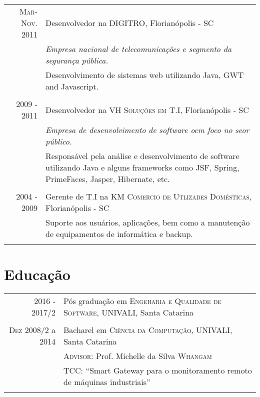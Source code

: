 \documentclass[a4paper,10pt]{article}
\begin{document}
\begin{tabular}{r|p{11cm}}
\textsc{Mar-Nov. 2011} & Desenvolvedor na \textsc{DIGITRO}, Florianópolis - SC \\ &\emph{Empresa nacional de telecomunicações e segmento da segurança pública.}\\&\footnotesize{Desenvolvimento de sistemas web utilizando Java, GWT and Javascript.} \\\multicolumn{2}{c}{} \\

\textsc{2009 - 2011} & Desenvolvedor na \textsc{VH Soluções em T.I}, Florianópolis - SC \\ &\emph{Empresa de desenvolvimento de software ocm foco no seor público.}\\&\footnotesize{Responsável pela análise e desenvolvimento de software utilizando Java e alguns frameworks como JSF, Spring, PrimeFaces, Jasper, Hibernate, etc.}\\\multicolumn{2}{c}{} \\

\textsc{2004 - 2009} & Gerente de T.I na \textsc{KM Comercio de Utlizades Domésticas}, Florianópolis - SC \\&\footnotesize{Suporte aos usuários, aplicações, bem como a manutenção de equipamentos de informática e backup.}\\\multicolumn{2}{c}{} \\ 

\end{tabular}

\section{Educação}

\begin{tabular}{r|p{11cm}}
\textsc{2016 - 2017/2} & Pós graduação em \textsc{Engeharia e Qualidade de Software}, UNIVALI, Santa Catarina\\\multicolumn{2}{c}{} \\
	
\textsc{Dez} 2008/2 a 2014 & Bacharel em \textsc{Ciência da Computação}, UNIVALI, Santa Catarina\\
&\normalsize \textsc{Advisor}: Prof. Michelle da Silva \textsc{Whangam}\\
& TCC: ``Smart Gateway para o monitoramento remoto de máquinas industriais''\\\multicolumn{2}{c}{} \\

\end{tabular}
\end{document}
